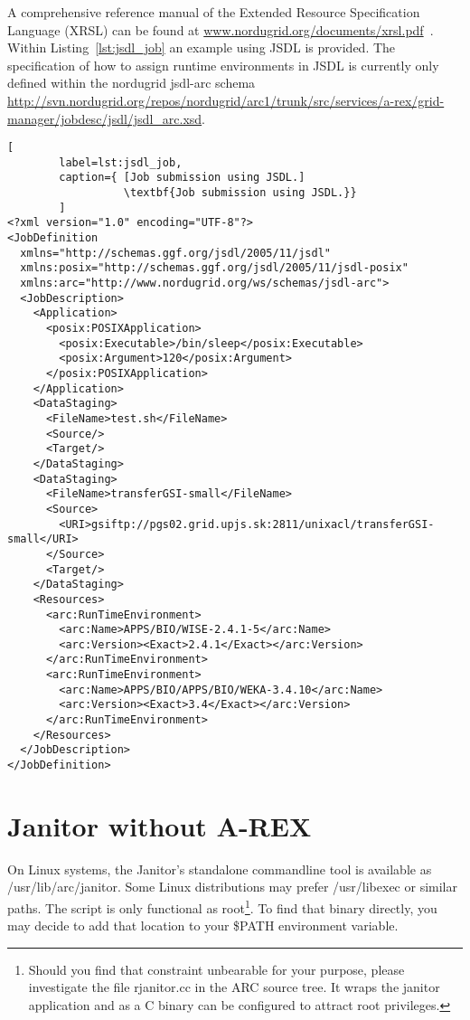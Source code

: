 A comprehensive reference manual of the Extended Resource Specification Language (XRSL) can be
found at \href{www.nordugrid.org/documents/xrsl.pdf}{www.nordugrid.org/documents/xrsl.pdf}~\cite{NORDUGRID_MANUAL_4}.
Within Listing~\ref{lst:jsdl_job} an example using JSDL is provided. The specification of how
to assign runtime environments in JSDL is currently only defined within the nordugrid jsdl-arc schema~
\href{http://svn.nordugrid.org/repos/nordugrid/arc1/trunk/src/services/a-rex/grid-manager/jobdesc/jsdl/jsdl_arc.xsd}
     {http://svn.nordugrid.org/repos/nordugrid/arc1/trunk/src/services/a-rex/grid-manager/jobdesc/jsdl/jsdl\_arc.xsd}.
\begin{lstlisting}[
        label=lst:jsdl_job,
        caption={ [Job submission using JSDL.]
                  \textbf{Job submission using JSDL.}}
        ]
<?xml version="1.0" encoding="UTF-8"?>
<JobDefinition
  xmlns="http://schemas.ggf.org/jsdl/2005/11/jsdl"
  xmlns:posix="http://schemas.ggf.org/jsdl/2005/11/jsdl-posix"
  xmlns:arc="http://www.nordugrid.org/ws/schemas/jsdl-arc">
  <JobDescription>
    <Application>
      <posix:POSIXApplication>
        <posix:Executable>/bin/sleep</posix:Executable>
        <posix:Argument>120</posix:Argument>
      </posix:POSIXApplication>
    </Application>
    <DataStaging>
      <FileName>test.sh</FileName>
      <Source/>
      <Target/>
    </DataStaging>
    <DataStaging>
      <FileName>transferGSI-small</FileName>
      <Source>
        <URI>gsiftp://pgs02.grid.upjs.sk:2811/unixacl/transferGSI-small</URI>
      </Source>
      <Target/>
    </DataStaging>
    <Resources>
      <arc:RunTimeEnvironment>
        <arc:Name>APPS/BIO/WISE-2.4.1-5</arc:Name>
        <arc:Version><Exact>2.4.1</Exact></arc:Version>
      </arc:RunTimeEnvironment>
      <arc:RunTimeEnvironment>
        <arc:Name>APPS/BIO/APPS/BIO/WEKA-3.4.10</arc:Name>
        <arc:Version><Exact>3.4</Exact></arc:Version>
      </arc:RunTimeEnvironment>
    </Resources>
  </JobDescription>
</JobDefinition>
\end{lstlisting}


\section{Janitor without A-REX}

On Linux systems, the Janitor's standalone commandline tool is available as /usr/lib/arc/janitor.
Some Linux distributions may prefer /usr/libexec or similar paths.
The script is only functional as root\footnote{Should you find that constraint unbearable for your purpose,
please investigate the file rjanitor.cc in the ARC source tree. It wraps the janitor application
and as a C binary can be configured to attract root privileges.}.
To find that binary directly, you may decide to add that location to your \$PATH environment variable.


